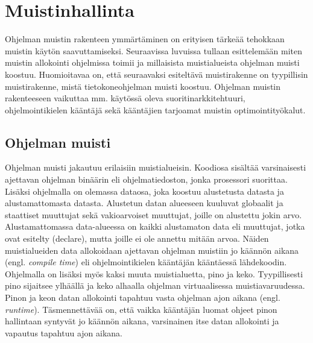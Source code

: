 \chapter{Muistinhallinta} \label{Toinen luku}

Ohjelman muistin rakenteen ymmärtäminen on erityisen tärkeää tehokkaan muistin käytön saavuttamiseksi. Seuraavissa luvuissa tullaan esittelemään miten muistin allokointi ohjelmissa toimii
ja millaisista muistialueista ohjelman muisti koostuu. Huomioitavaa on, että seuraavaksi esiteltävä muistirakenne on tyypillisin muistirakenne, mistä tietokoneohjelman muisti koostuu. Ohjelman muistin rakenteeseen vaikuttaa mm. käytössä oleva suoritinarkkitehtuuri, ohjelmointikielen kääntäjä sekä kääntäjien tarjoamat muistin optimointityökalut.

\section{Ohjelman muisti}

Ohjelman muisti jakautuu erilaisiin muistialueisin. Koodiosa sisältää varsinaisesti ajettavan ohjelman binäärin eli ohjelmatiedoston, jonka prosessori suorittaa. Lisäksi ohjelmalla on olemassa dataosa, joka koostuu alustetusta datasta ja alustamattomasta datasta. Alustetun datan alueeseen kuuluvat globaalit ja staattiset muuttujat sekä vakioarvoiset muuttujat, joille on alustettu jokin arvo. Alustamattomassa data-alueessa on kaikki alustamaton data eli muuttujat, jotka ovat esitelty (declare), mutta joille ei ole annettu mitään arvoa. Näiden muistialueiden data allokoidaan ajettavan ohjelman muistiin jo käännön aikana (engl. \textit{compile time}) eli ohjelmointikielen kääntäjän kääntäessä lähdekoodin. Ohjelmalla on lisäksi myös kaksi muuta muistialuetta, pino ja keko. Tyypillisesti pino sijaitsee ylhäällä ja keko alhaalla ohjelman virtuaalisessa muistiavaruudessa.\cite{mmic2010} Pinon ja keon datan allokointi tapahtuu vasta ohjelman ajon aikana (engl. \textit{runtime}). Täsmennettävää on, että vaikka kääntäjän luomat ohjeet pinon hallintaan syntyvät jo käännön aikana, varsinainen itse datan allokointi ja vapautus tapahtuu ajon aikana. \cite{ddm2015book}

